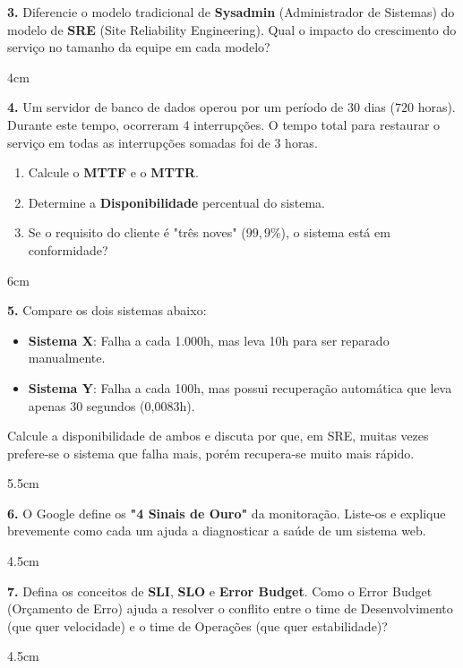 \documentclass[12pt]{article}
\begin{document}
\textbf{3.} Diferencie o modelo tradicional de \textbf{Sysadmin} (Administrador de Sistemas) do modelo de \textbf{SRE} (Site Reliability Engineering). Qual o impacto do crescimento do serviço no tamanho da equipe em cada modelo?
\begin{resposta}{4cm}
\end{resposta}




\textbf{4.} Um servidor de banco de dados operou por um período de 30 dias ($720$ horas). Durante este tempo, ocorreram $4$ interrupções. O tempo total para restaurar o serviço em todas as interrupções somadas foi de $3$ horas.
\begin{enumerate}[label=\alph*)]
    \item Calcule o \textbf{MTTF} e o \textbf{MTTR}.
    \item Determine a \textbf{Disponibilidade} percentual do sistema.
    \item Se o requisito do cliente é "três noves" ($99,9\%$), o sistema está em conformidade?
\end{enumerate}
\begin{resposta}{6cm}
\end{resposta}

\textbf{5.} Compare os dois sistemas abaixo:
\begin{itemize}
    \item \textbf{Sistema X}: Falha a cada 1.000h, mas leva 10h para ser reparado manualmente.
    \item \textbf{Sistema Y}: Falha a cada 100h, mas possui recuperação automática que leva apenas 30 segundos (0,0083h).
\end{itemize}
Calcule a disponibilidade de ambos e discuta por que, em SRE, muitas vezes prefere-se o sistema que falha mais, porém recupera-se muito mais rápido.
\begin{resposta}{5.5cm}
\end{resposta}




\textbf{6.} O Google define os \textbf{"4 Sinais de Ouro"} da monitoração. Liste-os e explique brevemente como cada um ajuda a diagnosticar a saúde de um sistema web.
\begin{resposta}{4.5cm}
\end{resposta}

\textbf{7.} Defina os conceitos de \textbf{SLI}, \textbf{SLO} e \textbf{Error Budget}. Como o Error Budget (Orçamento de Erro) ajuda a resolver o conflito entre o time de Desenvolvimento (que quer velocidade) e o time de Operações (que quer estabilidade)?
\begin{resposta}{4.5cm}
\end{resposta}
\end{document}
